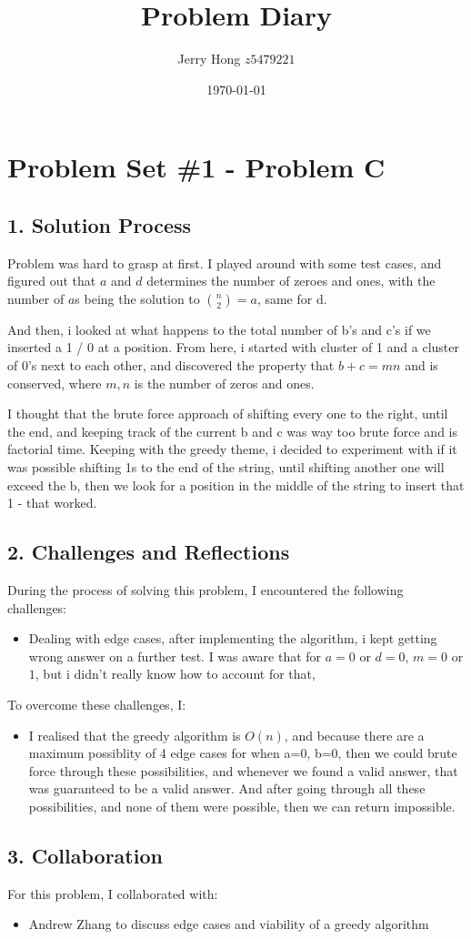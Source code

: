 \documentclass[a4paper,12pt]{article}
\title{Problem Diary}
\author{Jerry Hong $z5479221$}
\date{\today}
\begin{document}
\maketitle

\section*{Problem Set \#1 - Problem C}

\subsection*{1. Solution Process}
Problem was hard to grasp at first.
I played around with some test cases, and figured out that $a$ and $d$ determines the number of zeroes and ones, with the number of $a$s being the solution to $\binom{n}{2} = a$, same for d.

And then, i looked at what happens to the total number of b's and c's if we inserted a 1 / 0 at a position. From here, i started with cluster of 1 and a cluster of 0's next to each other, and discovered the property that $b+c = mn$ and is conserved, where $m, n$ is the number of zeros and ones.

I thought that the brute force approach of shifting every one to the right, until the end, and keeping track of the current b and c was way too brute force and is factorial time. Keeping with the greedy theme, i decided to experiment with if it was possible shifting 1s to the end of the string, until shifting another one will exceed the b, then we look for a position in the middle of the string to insert that 1 - that worked.

\subsection*{2. Challenges and Reflections}
During the process of solving this problem, I encountered the following challenges:
\begin{itemize}
    \item Dealing with edge cases, after implementing the algorithm, i kept getting wrong answer on a further test. I was aware that for $a = 0$ or $d = 0$, $m = 0 $ or $ 1$, but i didn't really know how to account for that, 
\end{itemize}

To overcome these challenges, I:
\begin{itemize}
    \item I realised that the greedy algorithm is $O(n)$, and because there are a maximum possiblity of 4 edge cases for when a=0, b=0, then we could brute force through these possibilities, and whenever we found a valid answer, that was guaranteed to be a valid answer. And after going through all these possibilities, and none of them were possible, then we can return impossible.
\end{itemize}

\subsection*{3. Collaboration}
For this problem, I collaborated with:
\begin{itemize}
    \item Andrew Zhang to discuss edge cases and viability of a greedy algorithm
\end{itemize}
\end{document}

